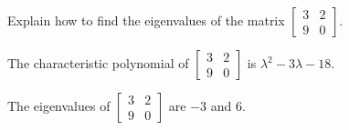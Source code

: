
\begin{exerciseStatement}


Explain how to find the eigenvalues of the matrix \( \left[\begin{array}{cc}
3 & 2 \\
9 & 0
\end{array}\right] \).


\end{exerciseStatement}
    
\begin{exerciseAnswer} 


The characteristic polynomial of \( \left[\begin{array}{cc}
3 & 2 \\
9 & 0
\end{array}\right] \) is \( \lambda^{2} - 3 \lambda - 18 \).



The eigenvalues of \( \left[\begin{array}{cc}
3 & 2 \\
9 & 0
\end{array}\right] \) are \( -3 \) and \( 6 \).


\end{exerciseAnswer}
    
